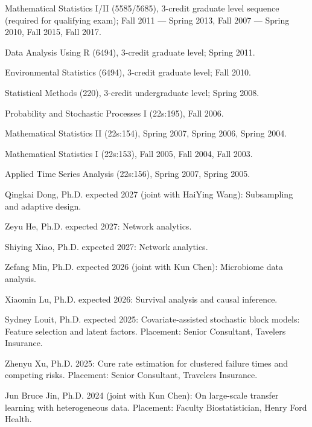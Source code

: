 \documentclass[Statistics]{vita}
\begin{document}
\begin{vita}
\begin{TeachingExperience}
\begin{UConn}
    \item Mathematical Statistics I/II (5585/5685), 3-credit graduate level sequence (required for qualifying exam); Fall 2011 --- Spring 2013, Fall 2007 --- Spring 2010, Fall 2015, Fall 2017.
    \item Data Analysis Using R (6494), 3-credit graduate level; Spring 2011.
    \item Environmental Statistics (6494), 3-credit graduate level; Fall 2010.
    \item Statistical Methods (220), 3-credit undergraduate level; Spring 2008.
    \end{UConn}
    \begin{UIowa}
    \item Probability and Stochastic Processes I (22s:195), Fall 2006.
    \item Mathematical Statistics II (22s:154), Spring 2007, Spring 2006, Spring 2004.
    \item Mathematical Statistics I (22s:153), Fall 2005, Fall 2004, Fall 2003.
    \item Applied Time Series Analysis (22s:156), Spring 2007, Spring 2005.
    \end{UIowa}
  \end{TeachingExperience}
  \begin{Students}
    \begin{Ph.D.}
    \item Qingkai Dong, Ph.D. expected 2027 (joint with HaiYing Wang): Subsampling and adaptive design.
    \item Zeyu He, Ph.D. expected 2027: Network analytics.
    \item Shiying Xiao, Ph.D. expected 2027: Network analytics.
    \item Zefang Min, Ph.D. expected 2026 (joint with Kun Chen): Microbiome data analysis.
    \item Xiaomin Lu, Ph.D. expected 2026: Survival analysis and causal inference.
    \item Sydney Louit, Ph.D. expected 2025: Covariate-assisted stochastic block models: Feature selection and latent factors. Placement: Senior Consultant, Tavelers Insurance.
    \item Zhenyu Xu, Ph.D. 2025: Cure rate estimation for clustered failure times and competing risks. Placement: Senior Consultant, Travelers Insurance.
    \item Jun Bruce Jin, Ph.D. 2024 (joint with Kun Chen): On large-scale transfer learning with heterogeneous data. Placement: Faculty Biostatistician, Henry Ford Health.

\end{Ph.D.}
\end{Students}
\end{vita}
\end{document}
